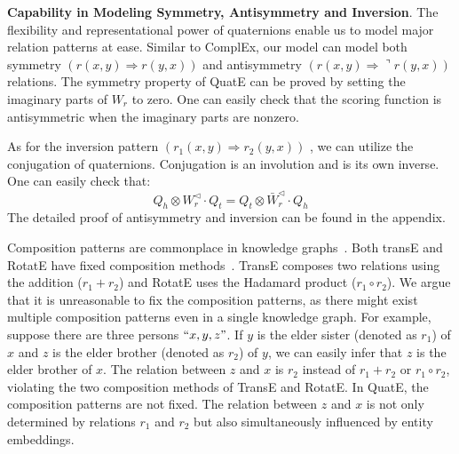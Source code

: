\documentclass{article}
\begin{document}
\textbf{Capability in Modeling Symmetry, Antisymmetry and Inversion}. The flexibility and representational power of quaternions enable us to model major relation patterns at ease. Similar to ComplEx, our model can model both symmetry $(r(x, y) \Rightarrow r(y, x))$ and antisymmetry $(r(x, y) \Rightarrow \urcorner r(y, x))$ relations. The symmetry property of QuatE can be proved by setting the imaginary parts of $W_r$ to zero. One can easily check that the scoring function is antisymmetric when the imaginary parts are nonzero.

As for the inversion pattern $(r_1(x, y) \Rightarrow r_2(y, x))$ , we can utilize the conjugation of quaternions. Conjugation is an involution and is its own inverse. One can easily check that:
\begin{equation}
    Q_h \otimes W_r^{\triangleleft} \cdot Q_t = Q_t \otimes \bar{W}_r^{\triangleleft} \cdot Q_h
\end{equation}
The detailed proof of antisymmetry and inversion can be found in the appendix.

Composition patterns are commonplace in knowledge graphs~\citep{lao2011random,neelakantan2015compositional}. Both transE and RotatE have fixed composition methods~\citep{sun2019rotate}. TransE composes two relations using the addition ($r_1+r_2$) and RotatE uses the Hadamard product ($r_1 \circ r_2$). We argue that it is unreasonable to fix the composition patterns, as there might exist multiple composition patterns even in a single knowledge graph. For example, suppose there are three persons $``x, y, z"$. If $y$ is the elder sister (denoted as $r_1$) of $x$ and $z$ is the elder brother (denoted as $r_2$) of $y$, we can easily infer that $z$ is the elder brother of $x$. The relation between $z$ and $x$ is $r_2$ instead of $r_1 + r_2$ or $r_1 \circ r_2$, violating the two composition methods of TransE and RotatE. In QuatE, the composition patterns are not fixed. The relation between $z$ and $x$ is not only determined by relations $r_1$ and $r_2$ but also simultaneously influenced by entity embeddings.
\end{document}
